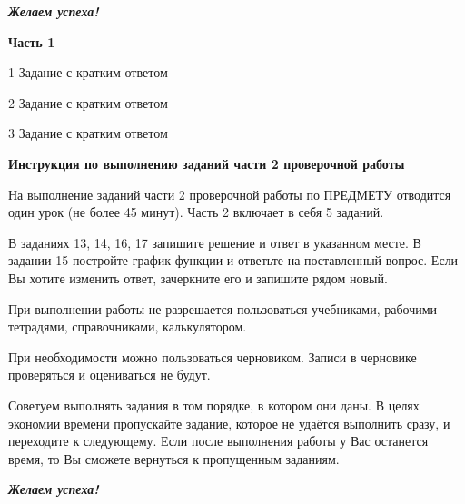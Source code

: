 \documentclass[vpr]{libre-oge}
\begin{document}
\medskip

\begin{center}
	\textit{\textbf{Желаем успеха!}} 
\end{center}

\newpage

\begin{center}
\textbf{Часть 1}
\smallskip
\end{center}

\begin{task}{1}
Задание с кратким ответом
\vpranswerfield
\end{task}

\begin{task}{2}
Задание с кратким ответом
\vpranswerfield
\end{task}

\begin{task}{3}
Задание с кратким ответом
\vpranswerfield
\end{task}

\newpage

\begin{center}
	\vspace*{10mm}
	\textbf{Инструкция по выполнению заданий части 2 проверочной работы}
	\vspace{10mm}
\end{center}

На выполнение заданий части 2 проверочной работы по ПРЕДМЕТУ отводится один
урок (не более 45 минут). Часть 2 включает в себя 5 заданий.

В заданиях 13, 14, 16, 17 запишите решение и ответ в указанном месте. В задании 15
постройте график функции и ответьте на поставленный вопрос. Если Вы хотите изменить
ответ, зачеркните его и запишите рядом новый.

При выполнении работы не разрешается пользоваться учебниками, рабочими
тетрадями, справочниками, калькулятором.

При необходимости можно пользоваться черновиком. Записи в черновике
проверяться и оцениваться не будут.

Советуем выполнять задания в том порядке, в котором они даны. В целях экономии
времени пропускайте задание, которое не удаётся выполнить сразу, и переходите
к следующему. Если после выполнения работы у Вас останется время, то Вы сможете
вернуться к пропущенным заданиям.

\medskip

\begin{center}
	\textit{\textbf{Желаем успеха!}} 
\end{center}
\end{document}
